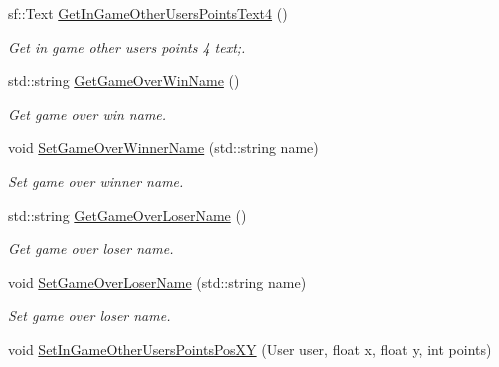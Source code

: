 \begin{DoxyCompactItemize}
\mbox{\label{class_scene_ad0dd362ee307861e9172d82e9743056e}} 
sf\+::\+Text \hyperlink{class_scene_ad0dd362ee307861e9172d82e9743056e}{Get\+In\+Game\+Other\+Users\+Points\+Text4} ()
\begin{DoxyCompactList}\small\item\em Get in game other users points 4 text;. \end{DoxyCompactList}\item 
\mbox{\label{class_scene_ac15d67d5b428ba39750e5f93e823b285}} 
std\+::string \hyperlink{class_scene_ac15d67d5b428ba39750e5f93e823b285}{Get\+Game\+Over\+Win\+Name} ()
\begin{DoxyCompactList}\small\item\em Get game over win name. \end{DoxyCompactList}\item 
\mbox{\label{class_scene_aca4047a5eb30c611197068c72a16012d}} 
void \hyperlink{class_scene_aca4047a5eb30c611197068c72a16012d}{Set\+Game\+Over\+Winner\+Name} (std\+::string name)
\begin{DoxyCompactList}\small\item\em Set game over winner name. \end{DoxyCompactList}\item 
\mbox{\label{class_scene_afd80687a6bf3f8324945d8c911986b8f}} 
std\+::string \hyperlink{class_scene_afd80687a6bf3f8324945d8c911986b8f}{Get\+Game\+Over\+Loser\+Name} ()
\begin{DoxyCompactList}\small\item\em Get game over loser name. \end{DoxyCompactList}\item 
\mbox{\label{class_scene_a41723bff4fabc191aa28326bbcd6b12c}} 
void \hyperlink{class_scene_a41723bff4fabc191aa28326bbcd6b12c}{Set\+Game\+Over\+Loser\+Name} (std\+::string name)
\begin{DoxyCompactList}\small\item\em Set game over loser name. \end{DoxyCompactList}\item 
\mbox{\label{class_scene_afbedeca41dbcd2afb3d4ad22e42ab5f8}} 
void \hyperlink{class_scene_afbedeca41dbcd2afb3d4ad22e42ab5f8}{Set\+In\+Game\+Other\+Users\+Points\+Pos\+XY} (User user, float x, float y, int points)

\end{DoxyCompactItemize}
